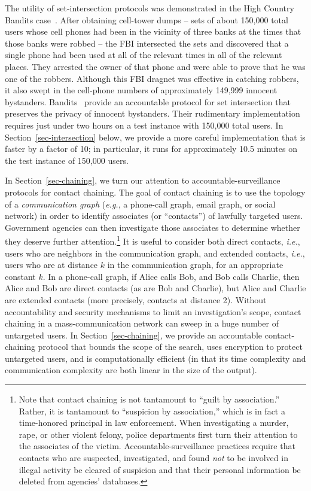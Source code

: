 The utility of set-intersection protocols was demonstrated in the 
High Country Bandits case~\cite{anderson13cell}.
After obtaining cell-tower dumps -- sets of about 150,000 total users
whose cell phones had been in the vicinity of three banks at the times
that those banks were robbed -- the FBI intersected the sets and discovered 
that a single phone had been used at all of the relevant times in all of the 
relevant places.  They arrested the owner
of that phone and were able to prove that he was one of the robbers.
Although this FBI dragnet was effective in catching robbers, it also swept
in the cell-phone numbers of approximately 149,999 innocent bystanders.
Bandits~\cite{sff-foci2014} provide an accountable protocol for
set intersection that preserves the privacy of innocent bystanders.  Their
rudimentary implementation requires just under two hours on a test instance
with 150,000 total users.  In Section~\ref{sec-intersection} below, we provide
a more careful implementation that is faster by a factor of 10; in particular,
it runs for approximately 10.5 minutes on the test instance of 150,000 users.

In Section~\ref{sec-chaining}, we turn our attention to 
accountable-surveillance protocols for contact chaining.
The goal of contact chaining is to use the topology of a {\it communication 
graph} ({\it e.g.}, a phone-call graph, email graph, or social network) 
in order to identify associates (or ``contacts'') of lawfully targeted users. 
Government agencies can then investigate those associates to determine whether
they deserve further attention.\footnote{Note that contact chaining is not
tantamount to ``guilt by association.''  Rather, it is tantamount to
``suspicion by association,'' which is in fact a time-honored principal in
law enforcement.  When investigating a murder, rape, or other violent felony,
police departments first turn their attention to the associates of the victim.
Accountable-surveillance practices require that contacts who are suspected,
investigated, and found {\it not} to be involved in illegal activity be 
cleared of suspicion and that their personal information be deleted from 
agencies' databases.} It is useful to consider both direct contacts, 
{\it i.e.}, users who are neighbors in the communication graph, and
extended contacts, {\it i.e.}, users who are at distance $k$ in the 
communication graph, for an appropriate constant $k$.
In a phone-call graph, if Alice calls Bob, 
and Bob calls Charlie, then Alice and Bob are direct contacts (as are Bob and 
Charlie), but Alice and Charlie are extended contacts (more precisely,
contacts at distance 2).  Without accountability and security mechanisms to
limit an investigation's scope, contact chaining in a mass-communication
network can sweep in a huge number of untargeted users.
In Section~\ref{sec-chaining}, we provide an accountable contact-chaining
protocol that bounds the scope of the search, uses encryption to protect 
untargeted users, and is computationally efficient (in that its time
complexity and communication complexity are both linear in the size of the 
output).

